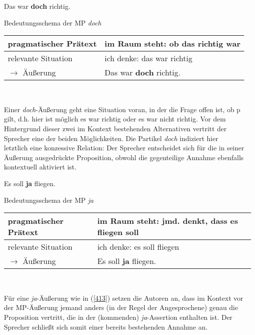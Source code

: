 \begin{exe}
	\ex\label{411} 
	Das war \textbf{doch} richtig.
\end{exe}
\vspace{-0.65cm}	
\begin{exe}
	\ex\label{412} Bedeutungsschema der MP \textit{doch}\\[-0.6em]
     \begin{tabular}[t]{|l|p{7cm}|}
     	\hline
      	pragmatischer Prätext & im Raum steht: ob das richtig war\\
        \hline
        relevante Situation & ich denke: das war richtig\\
        \hline
        $\rightarrow$ Äußerung & Das war \textbf{doch} richtig.\\
        \hline
     \end{tabular}\\
     \hbox{}\hfill\hbox{\citet[92]{Diewald1998}}
\end{exe}
Einer \textit{doch}-Äußerung geht eine Situation voran, in der die Frage offen ist, ob p gilt, d.h. hier ist möglich \glq es war richtig\grq {} oder \glq es war nicht richtig\grq {}. Vor dem Hintergrund dieser zwei im Kontext bestehenden Alternativen vertritt der Sprecher eine der beiden Möglichkeiten. Die Partikel \textit{doch} indiziert hier \\ letztlich eine konzessive Relation: Der Sprecher entscheidet sich für die in seiner Äußerung ausgedrückte Proposition, obwohl die gegenteilige Annahme ebenfalls kontextuell aktiviert ist.

 \begin{exe}
	\ex\label{413} 	
	Es soll \textbf{ja} fliegen.
	\hfill\hbox {\citet[93-94]{Diewald1998}}
\end{exe}
\vspace{-0.65cm}	
\begin{exe}
	\ex\label{414} Bedeutungsschema der MP \textit{ja}\\[-0.6em]
     \begin{tabular}[t]{|l|p{7cm}|}
     	\hline
      	pragmatischer Prätext & im Raum steht: jmd. denkt, dass es fliegen soll\\
        \hline
        relevante Situation & ich denke: es soll fliegen\\
        \hline
        $\rightarrow$ Äußerung & Es soll \textbf{ja} fliegen.\\
        \hline
     \end{tabular}\\
     \hbox{}\hfill\hbox{\citet[84]{Diewald1998}}
\end{exe}
Für eine \textit{ja}-Äußerung wie in (\ref{413}) setzen die Autoren an, dass im Kontext vor der MP-Äußerung jemand anders (in der Regel der Angesprochene) genau die Proposition vertritt, die in der (kommenden) \textit{ja}-Assertion enthalten ist. Der Sprecher schließt sich somit einer bereits bestehenden Annahme an.

